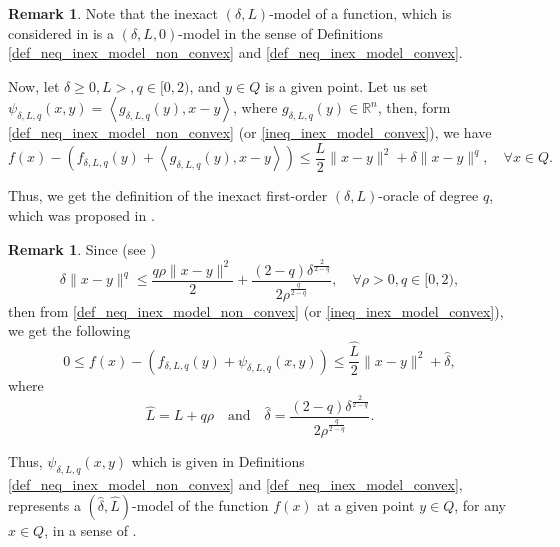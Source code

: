 \documentclass[11pt]{amsart}
\theoremstyle{definition}
\newtheorem{remark}[theorem]{Remark}
\numberwithin{equation}{section}
\begin{document}
\begin{remark}\label{remark_yassine_special}
Note that the inexact $(\delta, L)$-model of a function, which is considered in \cite{Gasnikov2019fast,Stonyakin2021OMS} is a $(\delta, L, 0)$-model in the sense of  Definitions \ref{def_neq_inex_model_non_convex} and \ref{def_neq_inex_model_convex}.

Now, let $\delta \geq 0, L>, q \in [0, 2)$, and  $y \in Q$ is a given point. Let us set  $\psi_{\delta, L ,  q} (x, y) = \left\langle g_{\delta, L, q} (y),  x - y \right\rangle$, where $g_{\delta, L, q}(y) \in \mathbb{R}^n$, then, form \eqref{def_neq_inex_model_non_convex} (or \eqref{ineq_inex_model_convex}), we have 
\[
    f(x) - \left( f_{\delta, L, q} (y) + \left\langle g_{\delta, L, q} (y),  x - y \right\rangle\right) \leq \frac{L}{2} \|x - y\|^2 + \delta \|x - y\|^q, \quad \forall x \in Q. 
\]

Thus, we get the definition of the inexact first-order $(\delta, L)$-oracle of degree $q$, which was proposed in \cite{Nabou2024qoracle}.
\end{remark}

\begin{remark}\label{rem_ordin_model}
Since (see \cite{Nabou2024qoracle})
\begin{equation}\label{eq_1242}
    \delta \|x - y\|^q \leq \frac{q \rho \|x - y\|^2}{2} + \frac{(2-q) \delta^{\frac{2}{2-q}}}{2 \rho^{\frac{q}{2-q}}}, \quad \forall \rho >0, q \in [0,2),
\end{equation}
then from \eqref{def_neq_inex_model_non_convex} (or \eqref{ineq_inex_model_convex}), we get the following
\begin{equation}\label{spesial_case_model}
    0 \leq f(x) - \left( f_{\delta, L, q} (y) + \psi_{\delta, L, q} (x, y)\right) \leq \frac{\widehat{L}}{2} \|x - y\|^2 + \widehat{\delta},
\end{equation}
where
\begin{equation}\label{parameters_spec}
   \widehat{L} = L + q \rho \quad \text{and} \quad \widehat{\delta} = \frac{(2-q) \delta^{\frac{2}{2-q}}}{2 \rho^{\frac{q}{2-q}}}. 
\end{equation}

Thus, $\psi_{\delta,L, q} (x, y)$ which is given in Definitions \ref{def_neq_inex_model_non_convex} and \ref{def_neq_inex_model_convex}, represents a $(\widehat{\delta}, \widehat{L})$-model of the function $f(x)$ at a given point $y \in Q$, for any $x \in Q$, in a sense of \cite{Gasnikov2019fast}. 
\end{remark}
\end{document}
